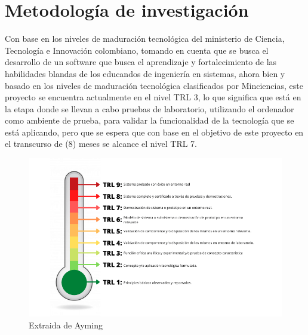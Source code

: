 \section{Metodología de investigación}
Con base en los niveles de maduración tecnológica del ministerio de Ciencia, Tecnología e Innovación colombiano, tomando en cuenta que se busca el desarrollo de un software que busca el aprendizaje y fortalecimiento de las habilidades blandas de los educandos de ingeniería en sistemas, ahora bien y basado en los niveles de maduración tecnológica clasificados por Minciencias, este proyecto se encuentra actualmente en el nivel TRL 3, lo que significa que está en la etapa donde se llevan a cabo pruebas de laboratorio, utilizando el ordenador como ambiente de prueba, para validar la funcionalidad de la tecnología que se está aplicando, pero que se espera que con base en el objetivo de este proyecto en el transcurso de (8) meses se alcance el nivel TRL 7.\cite{o}

\begin{figure}[ht]
  \centering
  \includegraphics[width=0.8\linewidth]{Imagenes/COL.png}
  \caption{Extraida de Ayming\cite{o}}
  \label{fig:imagen2}
\end{figure}
\newpage


